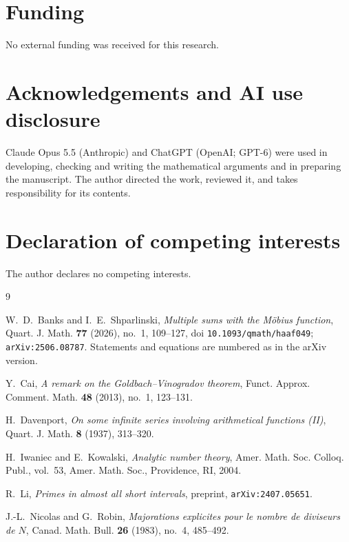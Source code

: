 \documentclass[11pt,a4paper]{article}
\theoremstyle{plain}
\theoremstyle{remark}
\begin{document}
\section*{Funding}
No external funding was received for this research.

\section*{Acknowledgements and AI use disclosure}
Claude Opus 5.5 (Anthropic) and ChatGPT (OpenAI; GPT-6) were used in developing, checking
and writing the mathematical arguments and in preparing the manuscript. The author directed
the work, reviewed it, and takes responsibility for its contents.

\section*{Declaration of competing interests}
The author declares no competing interests.


\begin{thebibliography}{9}
\setlength{\itemsep}{0pt}
\setlength{\parskip}{0pt}

W.~D.~Banks and I.~E.~Shparlinski,
\emph{Multiple sums with the M\"obius function},
Quart. J. Math. \textbf{77} (2026), no.~1, 109--127, doi \texttt{10.1093/qmath/haaf049};
\texttt{arXiv:2506.08787}. Statements and equations are numbered as in the arXiv version.

Y.~Cai,
\emph{A remark on the Goldbach--Vinogradov theorem},
Funct. Approx. Comment. Math. \textbf{48} (2013), no.~1, 123--131.

H.~Davenport,
\emph{On some infinite series involving arithmetical functions (II)},
Quart. J. Math. \textbf{8} (1937), 313--320.

H.~Iwaniec and E.~Kowalski,
\emph{Analytic number theory},
Amer. Math. Soc. Colloq. Publ., vol.~53, Amer. Math. Soc., Providence, RI, 2004.

R.~Li,
\emph{Primes in almost all short intervals},
preprint, \texttt{arXiv:2407.05651}.

J.-L.~Nicolas and G.~Robin,
\emph{Majorations explicites pour le nombre de diviseurs de $N$},
Canad. Math. Bull. \textbf{26} (1983), no.~4, 485--492.

\end{thebibliography}
\end{document}
